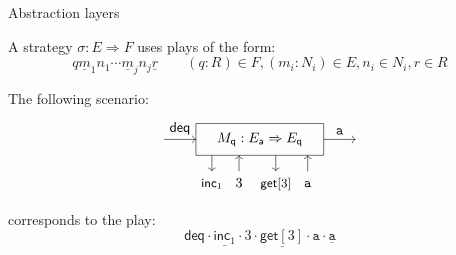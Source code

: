 \documentclass[aspectratio=141]{beamer}
\newcommand{\kw}[1]{\ensuremath{ \mathsf{#1} }}
\newcommand{\deqpic}[3]{%
  \begin{tikzpicture}[scale=0.4]
    \draw[->] (-6,0) -- node[above] {$\kw{deq}$} (-4,0);
    \draw (-4,-1) rectangle (4,1);
    \node (x) at (0,0) {$#1$};
    \draw[->] (-3, -1) -- (-3, -2);
    \node[anchor=base] at (-3, -3) {\small $\kw{inc}_1$};
    \draw[<-] (-1.3, -1) -- (-1.3, -2);
    \node[anchor=base] at (-1.3, -3) {$#2$};
    \draw[->] (1, -1) -- (1, -2);
    \node[anchor=base] at (1, -3) {\small $\kw{get}[#2]$};
    \draw[<-] (3, -1) -- (3, -2);
    \node[anchor=base] at (3, -3) {$#3$};
    \draw[->] (4,0) -- node[above] {$#3$} (6,0);
  \end{tikzpicture}%
}
\begin{document}
\begin{frame}{Abstraction layers} %


\begin{definition}[Plays]
A strategy $\sigma : E \Rightarrow F$ uses plays of the form:
\[
    q
    \underline{m}_1 n_1
    \cdots
    \underline{m}_j n_j
    \underline{r}
  \qquad
  (q \mathop{:} R) \in F, (m_i \mathop{:} N_i) \in E, n_i \in N_i, r \in R
\]
\end{definition}
\pause
\begin{example}
  The following scenario:
  \[
    \deqpic{M_\kw{q} : E_\kw{a} \Rightarrow E_\kw{q}}{3}{\mathtt{a}}
    \vspace{-0.5\baselineskip}
  \]
  corresponds to the play:
  \[
    \kw{deq} \cdot
    \underline{\kw{inc}_1} \cdot 3 \cdot
    \underline{\kw{get}[3]} \cdot \mathtt{a} \cdot
    \underline{\mathtt{a}}
  \]
\end{example}
\end{frame}
\end{document}
